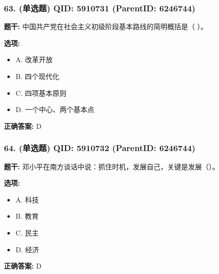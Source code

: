 \documentclass[12pt,UTF8]{ctexart}
\begin{document}
\vspace{0.3em}\hrulefill\vspace{0.7em}

\subsubsection*{63. (单选题) \small QID: 5910731 (ParentID: 6246744)}

\textbf{题干:}
中国共产党在社会主义初级阶段基本路线的简明概括是（ ）。



\textbf{选项:}
\begin{itemize}[leftmargin=*]

  \item A. 改革开放

  \item B. 四个现代化

  \item C. 四项基本原则

  \item D. 一个中心、两个基本点

\end{itemize}

\textbf{正确答案:}
D

\vspace{0.3em}\hrulefill\vspace{0.7em}

\subsubsection*{64. (单选题) \small QID: 5910732 (ParentID: 6246744)}

\textbf{题干:}
邓小平在南方谈话中说：抓住时机，发展自己，关键是发展（）。



\textbf{选项:}
\begin{itemize}[leftmargin=*]

  \item A. 科技

  \item B. 教育

  \item C. 民主

  \item D. 经济

\end{itemize}

\textbf{正确答案:}
D

\vspace{0.3em}\hrulefill\vspace{0.7em}
\end{document}
